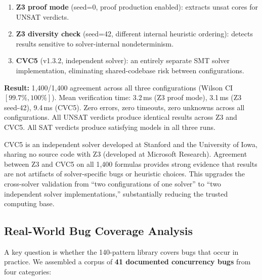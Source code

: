 \documentclass[11pt]{article}
\begin{document}
\begin{enumerate}[nosep]
\item \textbf{Z3 proof mode} (seed=0, proof production enabled):
  extracts unsat cores for UNSAT verdicts.
\item \textbf{Z3 diversity check} (seed=42, different internal
  heuristic ordering): detects results sensitive to solver-internal
  nondeterminism.
\item \textbf{CVC5} (v1.3.2, independent solver): an entirely
  separate SMT solver implementation, eliminating shared-codebase
  risk between configurations.
\end{enumerate}

\noindent
\textbf{Result:} 1{,}400/1{,}400 agreement across all three configurations
(Wilson CI $[99.7\%, 100\%]$).
Mean verification time: 3.2\,ms (Z3 proof mode), 3.1\,ms (Z3 seed-42),
9.4\,ms (CVC5).
Zero errors, zero timeouts, zero unknowns across all configurations.
All UNSAT verdicts produce identical results across Z3 and CVC5.
All SAT verdicts produce satisfying models in all three runs.

CVC5 is an independent solver developed at Stanford and the
University of Iowa, sharing no source code with Z3 (developed at
Microsoft Research).  Agreement between Z3 and CVC5 on all 1{,}400
formulas provides strong evidence that results are not artifacts of
solver-specific bugs or heuristic choices.  This upgrades the
cross-solver validation from ``two configurations of one solver''
to ``two independent solver implementations,'' substantially
reducing the trusted computing base.

\subsection{Real-World Bug Coverage Analysis}
\label{sec:bug-coverage}

A key question is whether the 140-pattern library covers bugs that
occur in practice.  We assembled a corpus of \textbf{41 documented
concurrency bugs} from four categories:
\end{document}
